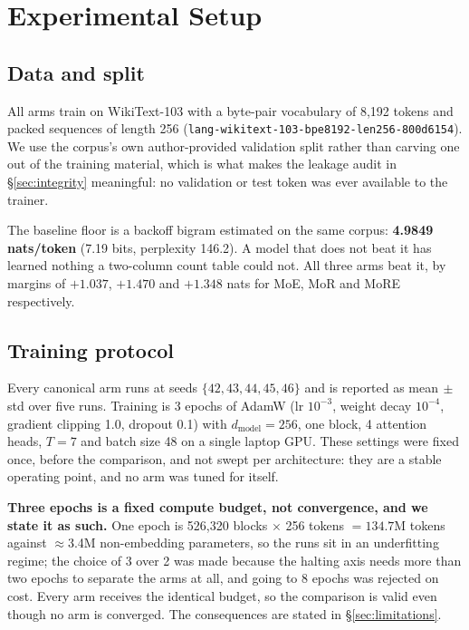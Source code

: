 \section{Experimental Setup}
\label{sec:setup}

\subsection{Data and split}
\label{sec:data}

All arms train on WikiText-103 \citep{merity2017wikitext} with a byte-pair
vocabulary of 8{,}192 tokens and packed sequences of length 256
(\texttt{lang-wikitext-103-bpe8192-len256-800d6154}). We use the corpus's own
author-provided validation split rather than carving one out of the training
material, which is what makes the leakage audit in \S\ref{sec:integrity}
meaningful: no validation or test token was ever available to the trainer.

The baseline floor is a backoff bigram estimated on the same corpus:
\textbf{4.9849 nats/token} (7.19 bits, perplexity 146.2). A model that does not
beat it has learned nothing a two-column count table could not. All three arms
beat it, by margins of $+1.037$, $+1.470$ and $+1.348$ nats for MoE, MoR and MoRE
respectively.

\subsection{Training protocol}
\label{sec:protocol}

Every canonical arm runs at seeds $\{42,43,44,45,46\}$ and is reported as
mean$\,\pm\,$std over five runs. Training is 3 epochs of AdamW (lr $10^{-3}$,
weight decay $10^{-4}$, gradient clipping 1.0, dropout 0.1) with
$d_{\text{model}} = 256$, one block, 4 attention heads, $T = 7$ and batch size 48
on a single laptop GPU. These settings were fixed once, before the comparison, and
not swept per architecture: they are a stable operating point, and no arm was tuned
for itself.

\textbf{Three epochs is a fixed compute budget, not convergence, and we state it
as such.} One epoch is 526{,}320 blocks $\times$ 256 tokens $= 134.7$M tokens
against $\approx$3.4M non-embedding parameters, so the runs sit in an underfitting
regime; the choice of 3 over 2 was made because the halting axis needs more than
two epochs to separate the arms at all, and going to 8 epochs was rejected on cost.
Every arm receives the identical budget, so the comparison is valid even though no
arm is converged. The consequences are stated in \S\ref{sec:limitations}.

